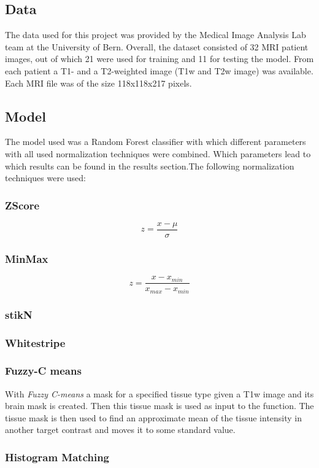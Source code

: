 \documentclass[journal]{IEEEtran}
\begin{document}
\subsection{Data}
	The data used for this project was provided by the Medical Image Analysis Lab team at the University of Bern. Overall, the dataset consisted of 32 MRI patient images,
	out of which 21 were used for training and 11 for testing the model. From each patient a T1- and a T2-weighted image (T1w and T2w image) was available. Each MRI file
	was of the size 118x118x217 pixels.
\subsection{Model}
	The model used was a Random Forest classifier with which different parameters with all used normalization techniques were combined. Which parameters
	lead to which results can be found in the results section.The following normalization techniques were used:
	\subsubsection{ZScore}
		\begin{equation}
			z = \frac{x - \mu}{\sigma}
		\end{equation}
	\subsubsection{MinMax}
		\begin{equation}
			z = \frac{x - x_{min}}{x_{max} - x_{min}}
		\end{equation}
	\subsubsection{stikN}
	\subsubsection{Whitestripe}
	\subsubsection{Fuzzy-C means} With {\itshape Fuzzy C-means} a mask for a specified tissue type given a T1w image and its brain mask is created. 
	Then this tissue mask is used as input to the function. 
	The tissue mask is then used to find an approximate mean of the tissue intensity in another target contrast and moves it to some standard value.
	\subsubsection{Histogram Matching}
\end{document}
